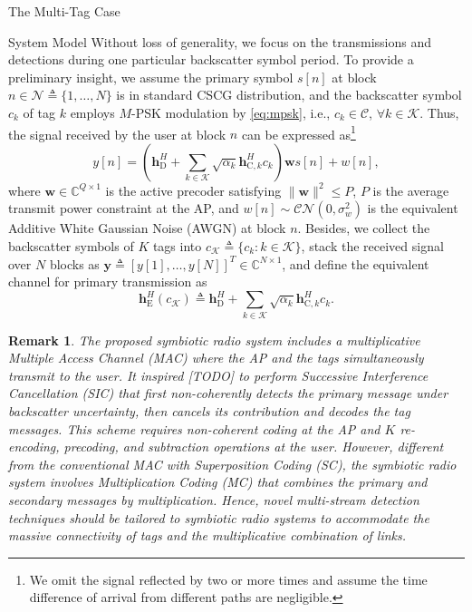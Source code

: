 \documentclass[journal]{IEEEtran}
\newtheorem{remark}{Remark}
\begin{document}
\begin{section}{The Multi-Tag Case}
\begin{subsection}{System Model}
			Without loss of generality, we focus on the transmissions and detections during one particular backscatter symbol period. To provide a preliminary insight, we assume the primary symbol $s[n]$ at block $n \in \mathcal{N} \triangleq \{1,\ldots,N\}$ is in standard CSCG distribution, and the backscatter symbol $c_k$ of tag $k$ employs $M$-PSK modulation by \eqref{eq:mpsk}, i.e., $c_k \in \mathcal{C}$, $\forall k \in \mathcal{K}$. Thus, the signal received by the user at block $n$ can be expressed as\footnote{We omit the signal reflected by two or more times\cite{Wu2019} and assume the time difference of arrival from different paths are negligible\cite{Guo2019b}.}
			\begin{equation}
				y[n] = \left(\boldsymbol{h}_{\mathrm{D}}^H + \sum_{k \in \mathcal{K}} \sqrt{\alpha_k} \boldsymbol{h}_{\mathrm{C},k}^H c_k\right) \boldsymbol{w} s[n] + w[n],
				\label{eq:received_signal}
			\end{equation}
			where $\boldsymbol{w} \in \mathbb{C}^{Q \times 1}$ is the active precoder satisfying $\lVert \boldsymbol{w} \rVert^2 \le P$, $P$ is the average transmit power constraint at the AP, and $w[n] \sim \mathcal{CN}(0,\sigma_w^2)$ is the equivalent Additive White Gaussian Noise (AWGN) at block $n$. Besides, we collect the backscatter symbols of $K$ tags into $c_{\mathcal{K}} \triangleq \{c_k : k \in \mathcal{K}\}$, stack the received signal over $N$ blocks as $\boldsymbol{y} \triangleq \left[y[1],\ldots,y[N]\right]^T \in \mathbb{C}^{N \times 1}$, and define the equivalent channel for primary transmission as
			\begin{equation}
				\boldsymbol{h}_{\mathrm{E}}^H(c_{\mathcal{K}}) \triangleq \boldsymbol{h}_{\mathrm{D}}^H + \sum_{k \in \mathcal{K}} \sqrt{\alpha_k} \boldsymbol{h}_{\mathrm{C},k}^H c_k.
				\label{eq:equivalent_primary_channel}
			\end{equation}

			\begin{remark}
				The proposed symbiotic radio system includes a multiplicative Multiple Access Channel (MAC) where the AP and the tags simultaneously transmit to the user. It inspired [TODO] to perform Successive Interference Cancellation (SIC) that first non-coherently detects the primary message under backscatter uncertainty, then cancels its contribution and decodes the tag messages. This scheme requires non-coherent coding at the AP and $K$ re-encoding, precoding, and subtraction operations at the user. However, different from the conventional MAC with Superposition Coding (SC), the symbiotic radio system involves Multiplication Coding (MC) that combines the primary and secondary messages by multiplication. Hence, novel multi-stream detection techniques should be tailored to symbiotic radio systems to accommodate the massive connectivity of tags and the multiplicative combination of links.
			\end{remark}
		\end{subsection}


\end{section}
\end{document}
